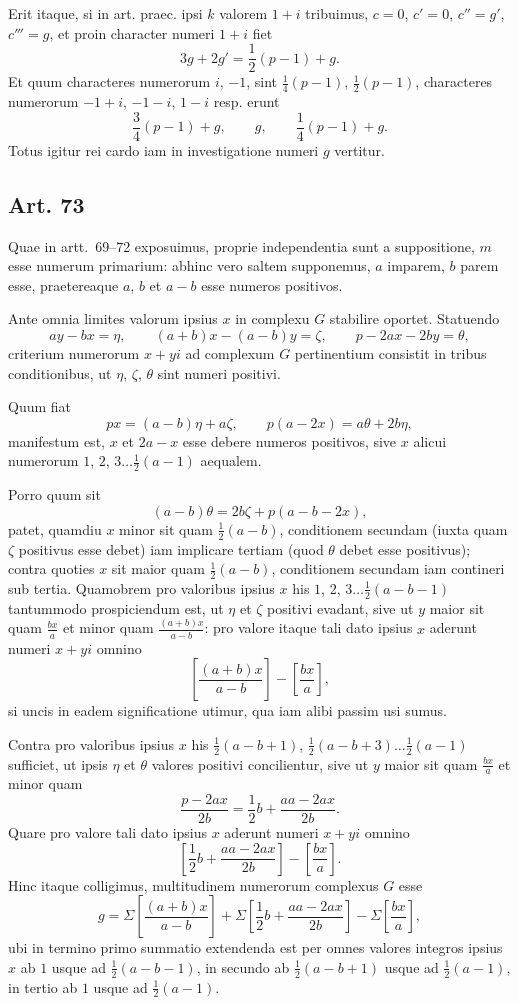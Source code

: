 \documentclass[12pt]{article}
\newcommand{\art}[1]{\subsection*{Art. #1}}
\newcommand{\gbrack}[1]{\left[#1\right]}
\begin{document}
Erit itaque, si in art. praec. ipsi $k$ valorem $1+i$ tribuimus, $c=0$, $c'=0$, $c''=g'$, $c'''=g$, et proin character numeri $1+i$ fiet
\[
3g+2g'=\frac12(p-1)+g.
\]
Et quum characteres numerorum $i$, $-1$, sint $\frac14(p-1)$, $\frac12(p-1)$, characteres numerorum $-1+i$, $-1-i$, $1-i$ resp. erunt
\[
\frac34(p-1)+g,\qquad g,\qquad \frac14(p-1)+g.
\]
Totus igitur rei cardo iam in investigatione numeri $g$ vertitur.

\art{73}
Quae in artt.~69--72 exposuimus, proprie independentia sunt a suppositione, $m$ esse numerum primarium: abhinc vero saltem supponemus, $a$ imparem, $b$ parem esse, praetereaque $a$, $b$ et $a-b$ esse numeros positivos.

Ante omnia limites valorum ipsius $x$ in complexu $G$ stabilire oportet. Statuendo
\[
ay-bx=\eta,\qquad (a+b)x-(a-b)y=\zeta,\qquad p-2ax-2by=\theta,
\]
criterium numerorum $x+yi$ ad complexum $G$ pertinentium consistit in tribus conditionibus, ut $\eta$, $\zeta$, $\theta$ sint numeri positivi.

Quum fiat
\[
px=(a-b)\eta+a\zeta,\qquad p(a-2x)=a\theta+2b\eta,
\]
manifestum est, $x$ et $2a-x$ esse debere numeros positivos, sive $x$ alicui numerorum $1$, $2$, $3\ldots\frac12(a-1)$ aequalem.

Porro quum sit
\[
(a-b)\theta=2b\zeta+p(a-b-2x),
\]
patet, quamdiu $x$ minor sit quam $\frac12(a-b)$, conditionem secundam (iuxta quam $\zeta$ positivus esse debet) iam implicare tertiam (quod $\theta$ debet esse positivus); contra quoties $x$ sit maior quam $\frac12(a-b)$, conditionem secundam iam contineri sub tertia. Quamobrem pro valoribus ipsius $x$ his $1$, $2$, $3\ldots\frac12(a-b-1)$ tantummodo prospiciendum est, ut $\eta$ et $\zeta$ positivi evadant, sive ut $y$ maior sit quam $\frac{bx}{a}$ et minor quam $\frac{(a+b)x}{a-b}$: pro valore itaque tali dato ipsius $x$ aderunt numeri $x+yi$ omnino
\[
\gbrack{\frac{(a+b)x}{a-b}}-\gbrack{\frac{bx}{a}},
\]
si uncis in eadem significatione utimur, qua iam alibi passim usi sumus.

Contra pro valoribus ipsius $x$ his $\frac12(a-b+1)$, $\frac12(a-b+3)\ldots\frac12(a-1)$ sufficiet, ut ipsis $\eta$ et $\theta$ valores positivi concilientur, sive ut $y$ maior sit quam $\frac{bx}{a}$ et minor quam
\[
\frac{p-2ax}{2b}=\frac12b+\frac{aa-2ax}{2b}.
\]
Quare pro valore tali dato ipsius $x$ aderunt numeri $x+yi$ omnino
\[
\gbrack{\frac12b+\frac{aa-2ax}{2b}}-\gbrack{\frac{bx}{a}}.
\]
Hinc itaque colligimus, multitudinem numerorum complexus $G$ esse
\[
g=\Sigma\gbrack{\frac{(a+b)x}{a-b}}
 +\Sigma\gbrack{\frac12b+\frac{aa-2ax}{2b}}
 -\Sigma\gbrack{\frac{bx}{a}},
\]
ubi in termino primo summatio extendenda est per omnes valores integros ipsius $x$ ab $1$ usque ad $\frac12(a-b-1)$, in secundo ab $\frac12(a-b+1)$ usque ad $\frac12(a-1)$, in tertio ab $1$ usque ad $\frac12(a-1)$.
\end{document}

